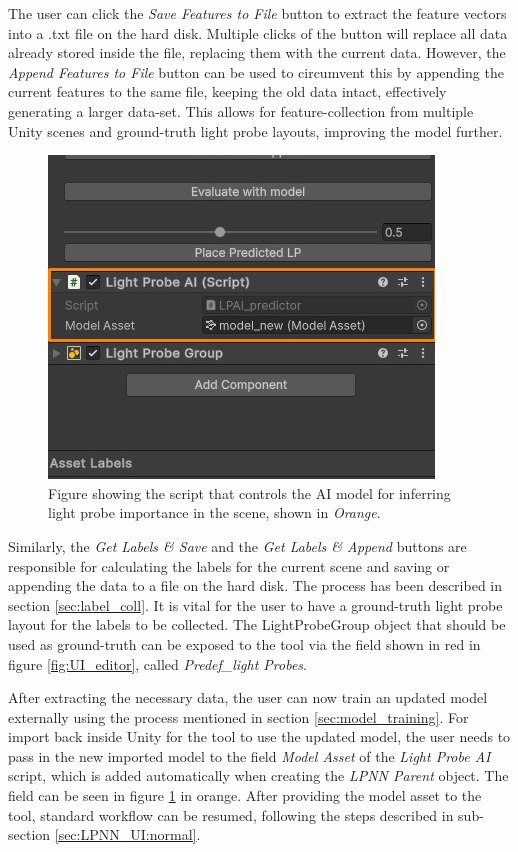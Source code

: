 The user can click the \textit{Save Features to File} button to extract the feature vectors into a .txt file on the hard disk. Multiple clicks of the button will replace all data already stored inside the file, replacing them with the current data. However, the \textit{Append Features to File} button can be used to circumvent this by appending the current features to the same file, keeping the old data intact, effectively generating a larger data-set. This allows for feature-collection from multiple Unity scenes and ground-truth light probe layouts, improving the model further.

\begin{figure}[h]
	\centering
	\includegraphics[scale=0.7]{Graphics/UI_ai.jpg}
	\caption{Figure showing the script that controls the AI model for inferring light probe importance in the scene, shown in \textit{Orange}.}
	\label{fig:UI_ai}
\end{figure}

Similarly, the \textit{Get Labels \& Save} and the \textit{Get Labels \& Append} buttons are responsible for calculating the labels for the current scene and saving or appending the data to a file on the hard disk. The process has been described in section \ref{sec:label_coll}. It is vital for the user to have a ground-truth light probe layout for the labels to be collected. The LightProbeGroup object that should be used as ground-truth can be exposed to the tool via the field shown in red in figure \ref{fig:UI_editor}, called \textit{Predef\_light Probes}.

After extracting the necessary data, the user can now train an updated model externally using the process mentioned in section \ref{sec:model_training}. For import back inside Unity for the tool to use the updated model, the user needs to pass in the new imported model to the field \textit{Model Asset} of the \textit{Light Probe AI} script, which is added automatically when creating the \textit{LPNN Parent} object. The field can be seen in figure \ref{fig:UI_ai} in orange. After providing the model asset to the tool, standard workflow can be resumed, following the steps described in sub-section \ref{sec:LPNN_UI:normal}.

